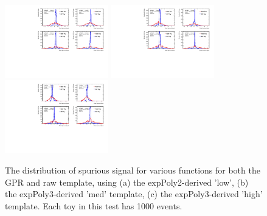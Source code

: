 \begin{figure} 
\begin{center}
  \includegraphics[width=0.4\textwidth]{figures/background/gpr/validation/nominal/ToyTest_FitSigVals_lowpT_1000_noSig}   
  \includegraphics[width=0.4\textwidth]{figures/background/gpr/validation/nominal/ToyTest_FitSigVals_medpT_1000_noSig}   
  \includegraphics[width=0.4\textwidth]{figures/background/gpr/validation/nominal/ToyTest_FitSigVals_highpT_1000_noSig}   
\caption{The distribution of spurious signal for various functions for both the GPR and raw template, using (a) the expPoly2-derived 'low', (b) the expPoly3-derived 'med' template, (c) the expPoly3-derived 'high' template. Each toy in this test has 1000 events.}
\label{fig:lowpt_1000_noSig}
\end{center}
\end{figure}

